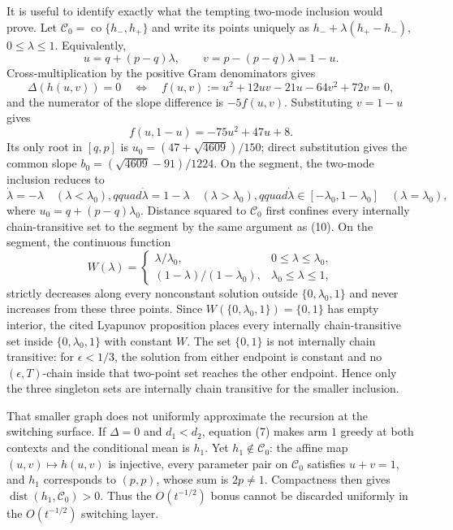It is useful to identify exactly what the tempting two-mode inclusion would prove. Let \(\mathcal C_0=\operatorname{co}\{h_-,h_+\}\) and write its points uniquely as \(h_-+\lambda(h_+-h_-)\), \(0\le\lambda\le1\). Equivalently,
\[
 u=q+(p-q)\lambda,\qquad v=p-(p-q)\lambda=1-u. \tag{11}
\]
Cross-multiplication by the positive Gram denominators gives
\[
 \Delta(h(u,v))=0
 \quad\Longleftrightarrow\quad
 f(u,v):=u^2+12uv-21u-64v^2+72v=0, \tag{12}
\]
and the numerator of the slope difference is \(-5f(u,v)\). Substituting \(v=1-u\) gives
\[
 f(u,1-u)=-75u^2+47u+8.
\]
Its only root in \([q,p]\) is \(u_0=(47+\sqrt{4609})/150\); direct substitution gives the common slope \(b_0=(\sqrt{4609}-91)/1224\). On the segment, the two-mode inclusion reduces to
\[
 \dot\lambda=-\lambda\quad(\lambda<\lambda_0),qquad
 \dot\lambda=1-\lambda\quad(\lambda>\lambda_0),qquad
 \dot\lambda\in[-\lambda_0,1-\lambda_0]\quad(\lambda=\lambda_0), \tag{13}
\]
where \(u_0=q+(p-q)\lambda_0\). Distance squared to \(\mathcal C_0\) first confines every internally chain-transitive set to the segment by the same argument as (10). On the segment, the continuous function
\[
 W(\lambda)=
 \begin{cases}\lambda/\lambda_0,&0\le\lambda\le\lambda_0,\\
 (1-\lambda)/(1-\lambda_0),&\lambda_0\le\lambda\le1,
 \end{cases}
\]
strictly decreases along every nonconstant solution outside \(\{0,\lambda_0,1\}\) and never increases from these three points. Since \(W(\{0,\lambda_0,1\})=\{0,1\}\) has empty interior, the cited Lyapunov proposition places every internally chain-transitive set inside \(\{0,\lambda_0,1\}\) with constant \(W\). The set \(\{0,1\}\) is not internally chain transitive: for \(\epsilon<1/3\), the solution from either endpoint is constant and no \((\epsilon,T)\)-chain inside that two-point set reaches the other endpoint. Hence only the three singleton sets are internally chain transitive for the smaller inclusion.

That smaller graph does not uniformly approximate the recursion at the switching surface. If \(\Delta=0\) and \(d_1<d_2\), equation (7) makes arm \(1\) greedy at both contexts and the conditional mean is \(h_1\). Yet \(h_1\notin\mathcal C_0\): the affine map \((u,v)\mapsto h(u,v)\) is injective, every parameter pair on \(\mathcal C_0\) satisfies \(u+v=1\), and \(h_1\) corresponds to \((p,p)\), whose sum is \(2p\ne1\). Compactness then gives \(\operatorname{dist}(h_1,\mathcal C_0)>0\). Thus the \(O(t^{-1/2})\) bonus cannot be discarded uniformly in the \(O(t^{-1/2})\) switching layer.

